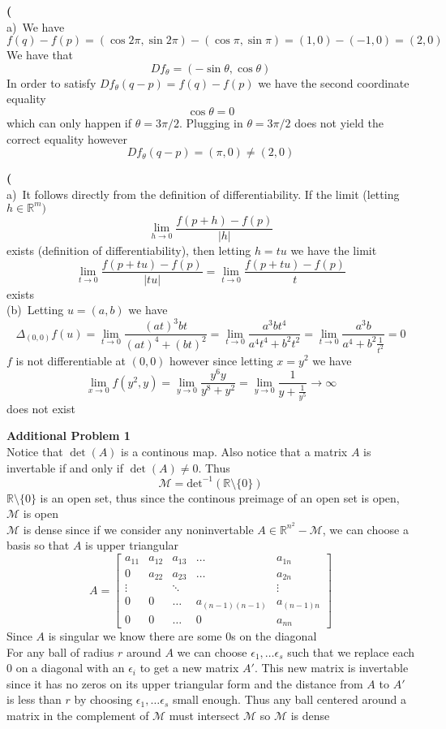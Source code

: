 \documentclass[12pt]{article}
\newenvironment{ques}[1]{\textbf{#1}\vspace{1 mm}\\ }{\bigskip}
\theoremstyle{definition}
\newcommand{\R}{\mathbb R}
\newcommand{\s}{\sin}
\renewcommand{\c}{\cos}
\renewcommand{\t}{\theta}
\begin{document}
\begin{ques}{17}
	(a)\ We have
	$$f(q) - f(p) = (\c 2\pi, \s 2\pi) - (\c \pi, \s \pi) = (1,0) - (-1,0) =
	(2,0)$$
	We have that
	$$Df_\t = (-\s \t, \c \t)$$
	In order to satisfy $Df_\t(q-p) = f(q) - f(p)$ we have the second coordinate equality
	$$\c \t = 0$$
	which can only happen if $\t = 3\pi/2$. Plugging in $\t = 3\pi/2$ does not
	yield the correct equality however
	$$Df_\t(q-p) = (\pi,0) \neq (2,0)$$
\end{ques}

\begin{ques}{18}
	(a)\ It follows directly from the definition of differentiability. If the limit
	(letting $h \in \R^m)$
	$$\lim_{h \to 0} \frac{f(p + h) - f(p)}{|h|}$$
	exists (definition of differentiability), then letting $h = tu$ we have the limit
	$$\lim_{t \to 0} \frac{f(p + tu) - f(p)}{|tu|} = \lim_{t \to 0} \frac{f(p +
	tu) - f(p)}{t} $$
	exists \\
	(b)\ Letting $u = (a,b)$ we have 
	$$\Delta_{(0,0)}f(u) = \lim_{t \to 0} \frac{(at)^3bt}{(at)^4 + (bt)^2} =
	\lim_{t \to 0} \frac{a^3bt^4}{a^4t^4 + b^2t^2} = \lim_{t \to 0}
	\frac{a^3b}{a^4 + b^2\frac{1}{t^2}} = 0$$
	$f$ is not differentiable at $(0,0)$ however since letting $x = y^2$ we have
	$$\lim_{x \to 0} f(y^2,y) = \lim_{y \to 0} \frac{y^6y}{y^8 + y^2} = \lim_{y
	\to 0}\frac{1}{y + \frac{1}{y^5}} \to \infty$$
	does not exist
\end{ques}

\begin{ques}{Additional Problem 1}
	Notice that $\det(A)$ is a continous map. Also notice that a matrix $A$ is
	invertable if and only if $\det(A) \neq 0$. Thus
	$$\mathcal M = \text{det}^{-1}(\R \setminus \{0\})$$
	$\R \setminus \{0\}$ is an open set, thus since the continous preimage of
	an open set is open, $\mathcal M$ is open\\
	$\mathcal M$ is dense since if we consider any noninvertable $A \in
	\R^{n^2} - \mathcal M$, we can choose a basis so that $A$ is upper
	triangular 
	$$A = 
	\begin{bmatrix}
	a_{11} & a_{12} & a_{13} & \dots & a_{1n}\\
	0 & a_{22} & a_{23} & \dots & a_{2n}\\
	\vdots &  & \ddots & & \vdots\\
	0 & 0 & \dots & a_{(n-1)(n-1)} & a_{(n-1)n}\\
	0 & 0 & \dots & 0 & a_{nn}
	\end{bmatrix}$$
	Since $A$ is singular we know there are some $0$s on the diagonal\\
	For any ball of radius $r$ around $A$ we can choose $\epsilon_1, \dots
	\epsilon_s$ such that we replace each $0$ on a diagonal with an
	$\epsilon_i$ to get a new matrix $A'$. This new matrix is invertable since
	it has no zeros on its upper triangular form and the distance from $A$ to
	$A'$ is less than $r$ by choosing $\epsilon_1, \dots \epsilon_s$ small
	enough. Thus any ball centered around a matrix in the complement of
	$\mathcal M$ must intersect $\mathcal M$ so $\mathcal M$ is dense
\end{ques}
\end{document}
